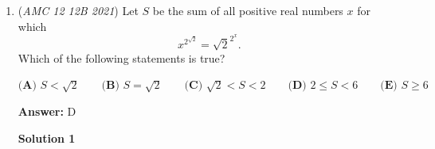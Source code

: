 \begin{enumerate}
 



\textbf{Solution 9 (Modular Arithmetic in less than a minute, basically a slightly modified solution 1)}

Notice that $z^{3} - 1 \equiv 0 \pmod{z^2 + z + 1}$ because $z^3 - 1 = (z-1)(z^{2} + z + 1).$ So we can add this to $z^{2021} + 1$: 
 \[z^{2021} + z^{3} \equiv z^{2021} + 1 \pmod{z^2 + z + 1}\]
 \[\implies z^{3}(z^{2018} + 1) \equiv 1*(z^{2018} + 1) \pmod{z^2 + z + 1}\] We can generalize this by saying $z^{2021 - 3n} + 1 \equiv z^{2021} + 1 \pmod{z^2 + z + 1}$ as long as $2021 - 3n$ is positive. So we can minimize $2021 - 3n$ by setting $n = 673.$ Then we get: 
 \[z^{2} + 1 \equiv z^{2021} + 1 \pmod{z^2 + z + 1}\] And this is clearly $\boxed{\textbf{(A) }{-}z}$. 

 



\textbf{Solution 10 (Easy Modular arithmetic, Similar to solution 9)}

Similarly $z^{3} - 1 \equiv 0 \pmod{z^2 + z + 1}$ because $z^3 - 1 = (z-1)(z^{2} + z + 1).$

 So,

 
 \[z^3\equiv1\pmod{z^2 + z + 1}\]

 \[\implies R(z) \equiv z^{2021} +1\equiv (z^{3})^{673} \cdot z^{2}+1 \equiv z^{2} +1  \pmod{z^2 + z + 1}\]

 
Meaning,

 
 \[R(z)\equiv z^{2} +1 \pmod{z^2 + z + 1}\]

 Notice $z^{2}\equiv -(z+1)  \pmod{z^2 + z + 1}\implies z^2+1\equiv -(z+1)+1\equiv -z  \pmod{z^2 + z + 1}$ so

 
 \[R(z)\equiv -z  \pmod{z^2 + z + 1}\]

 Gives our answer  $\boxed{\textbf{(A) }{-}z}$. 

 


 


	\item (\textit{AMC 12 12B 2021}) Let $S$ be the sum of all positive real numbers $x$ for which
 \[x^{2^{\sqrt2}}=\sqrt2^{2^x}.\]Which of the following statements is true?


 $\textbf{(A) }S<\sqrt2 \qquad \textbf{(B) }S=\sqrt2 \qquad \textbf{(C) }\sqrt2<S<2\qquad \textbf{(D) }2\le S<6 \qquad \textbf{(E) }S\ge 6$

 \textbf{Answer: }D



\textbf{Solution 1}


\end{enumerate}
